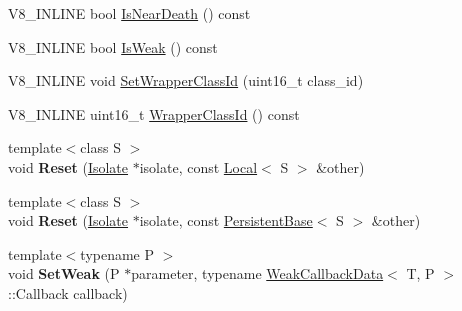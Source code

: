 \begin{DoxyCompactItemize}
\item 
V8\+\_\+\+I\+N\+L\+I\+NE bool \hyperlink{classv8_1_1_persistent_base_a4a64c26d91ed6a276aa8a7ca4bb7683a}{Is\+Near\+Death} () const 
\item 
V8\+\_\+\+I\+N\+L\+I\+NE bool \hyperlink{classv8_1_1_persistent_base_a714b7794149df483837a2c6b09d52396}{Is\+Weak} () const 
\item 
V8\+\_\+\+I\+N\+L\+I\+NE void \hyperlink{classv8_1_1_persistent_base_ac4c979164b3ed4dc92319e6f5a108d3d}{Set\+Wrapper\+Class\+Id} (uint16\+\_\+t class\+\_\+id)
\item 
V8\+\_\+\+I\+N\+L\+I\+NE uint16\+\_\+t \hyperlink{classv8_1_1_persistent_base_a01a46bf4e69ed9a837639702ee234643}{Wrapper\+Class\+Id} () const 
\item 
{\footnotesize template$<$class S $>$ }\\void {\bfseries Reset} (\hyperlink{classv8_1_1_isolate}{Isolate} $\ast$isolate, const \hyperlink{classv8_1_1_local}{Local}$<$ S $>$ \&other)\hypertarget{classv8_1_1_persistent_base_ab4b4d3fba3498486f1f10dc7d5be90fc}{}\label{classv8_1_1_persistent_base_ab4b4d3fba3498486f1f10dc7d5be90fc}

\item 
{\footnotesize template$<$class S $>$ }\\void {\bfseries Reset} (\hyperlink{classv8_1_1_isolate}{Isolate} $\ast$isolate, const \hyperlink{classv8_1_1_persistent_base}{Persistent\+Base}$<$ S $>$ \&other)\hypertarget{classv8_1_1_persistent_base_a67cbcedf77d176d3870fa4993e300b61}{}\label{classv8_1_1_persistent_base_a67cbcedf77d176d3870fa4993e300b61}

\item 
{\footnotesize template$<$typename P $>$ }\\void {\bfseries Set\+Weak} (P $\ast$parameter, typename \hyperlink{classv8_1_1_weak_callback_data}{Weak\+Callback\+Data}$<$ T, P $>$\+::Callback callback)\hypertarget{classv8_1_1_persistent_base_aaf342ece1a4ba926ba62e8d6af7be777}{}\label{classv8_1_1_persistent_base_aaf342ece1a4ba926ba62e8d6af7be777}

\end{DoxyCompactItemize}
